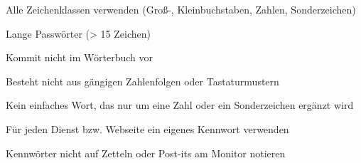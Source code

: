 \item Alle Zeichenklassen verwenden (Groß-, Kleinbuchstaben, Zahlen, Sonderzeichen)
\item Lange Passwörter (> 15 Zeichen)
\item Kommit nicht im Wörterbuch vor
\item Besteht nicht aus gängigen Zahlenfolgen oder Tastaturmustern
\item Kein einfaches Wort, das nur um eine Zahl oder ein Sonderzeichen ergänzt wird
\item Für jeden Dienst bzw. Webseite ein eigenes Kennwort verwenden
\item Kennwörter nicht auf Zetteln oder Post-its am Monitor notieren
